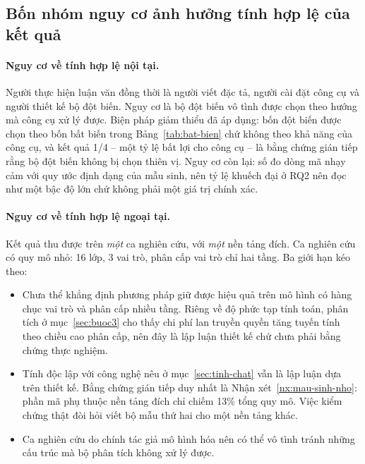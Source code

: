 \subsection{Bốn nhóm nguy cơ ảnh hưởng tính hợp lệ của kết quả}
\label{subsec:threats}

\paragraph{Nguy cơ về tính hợp lệ nội tại.}
Người thực hiện luận văn đồng thời là người viết đặc tả, người cài đặt công cụ và người thiết kế bộ đột biến. Nguy cơ là bộ đột biến vô tình được chọn theo hướng mà công cụ xử lý được. Biện pháp giảm thiểu đã áp dụng: bốn đột biến được chọn theo bốn bất biến trong Bảng~\ref{tab:bat-bien} chứ không theo khả năng của công cụ, và kết quả 1/4 -- một tỷ lệ bất lợi cho công cụ -- là bằng chứng gián tiếp rằng bộ đột biến không bị chọn thiên vị. Nguy cơ còn lại: số đo dòng mã nhạy cảm với quy ước định dạng của mẫu sinh, nên tỷ lệ khuếch đại ở RQ2 nên đọc như một bậc độ lớn chứ không phải một giá trị chính xác.

\paragraph{Nguy cơ về tính hợp lệ ngoại tại.}
Kết quả thu được trên \emph{một} ca nghiên cứu, với \emph{một} nền tảng đích. Ca nghiên cứu có quy mô nhỏ: 16 lớp, 3 vai trò, phân cấp vai trò chỉ hai tầng. Ba giới hạn kéo theo:

\begin{itemize}[leftmargin=1.6em,itemsep=2pt]
  \item Chưa thể khẳng định phương pháp giữ được hiệu quả trên mô hình có hàng chục vai trò và phân cấp nhiều tầng. Riêng về độ phức tạp tính toán, phân tích ở mục~\ref{sec:buoc3} cho thấy chi phí lan truyền quyền tăng tuyến tính theo chiều cao phân cấp, nên đây là lập luận thiết kế chứ chưa phải bằng chứng thực nghiệm.
  \item Tính độc lập với công nghệ nêu ở mục~\ref{sec:tinh-chat} vẫn là lập luận dựa trên thiết kế. Bằng chứng gián tiếp duy nhất là Nhận xét~\ref{nx:mau-sinh-nho}: phần mã phụ thuộc nền tảng đích chỉ chiếm 13\% tổng quy mô. Việc kiểm chứng thật đòi hỏi viết bộ mẫu thứ hai cho một nền tảng khác.
  \item Ca nghiên cứu do chính tác giả mô hình hóa nên có thể vô tình tránh những cấu trúc mà bộ phân tích không xử lý được.
\end{itemize}

